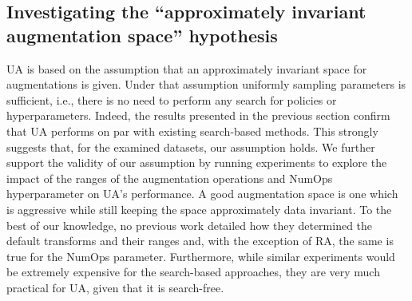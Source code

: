 \documentclass[runningheads]{llncs}
\newcommand{\attn}[1]{\textcolor{red}{(#1)}}
\begin{document}
	
	\begin{comment}
	\subsection{Discussion}
	\label{sec:discussions}
	
	A continuous parameter space covers a wider range of values and adds more variety to the data when compared to a discrete parameter space. Discretizing the search space reduces the chances of finding the optimal solution by limiting the search space into a limited number of options for parameters. Contrary to AA and RA, FAA searches for parameters over a continuous space. Although it has shown improvements over the baseline models and its search algorithm is proved to be effective, it suffers from a costly search phase. In fact, all of the aforementioned methods require search algorithms that are very expensive in terms of computational time and space comparing to our method. 
In this paper, we have reported the performance of random selection of augmentation functions over a continuous space and we argue, with theoretical evidence, that this setting is what should be used by researchers for fair comparison of augmentation pipelines with randomness, instead of a discrete space. 
	\attn{I think this paragraph, although technically correct, should be removed.  It breaks the flows as it seems to be drawing conclusiona from the experiments but then it's followwd by more experiments.  I'd remove 4.1 altogether.}
	
	\end{comment}
	
	\subsection{Investigating the ``approximately invariant augmentation space'' hypothesis}
	
	UA is based on the assumption that an approximately invariant space for augmentations is given.  Under that assumption uniformly sampling parameters is sufficient, i.e., there is no need to perform any search for policies or hyperparameters.  
	Indeed, the results presented in the previous section confirm that UA performs on par with existing search-based methods.  This strongly suggests that, for the examined datasets, our assumption holds. 
	We further support the validity of our assumption by running experiments to explore the impact of the ranges of the augmentation operations and NumOps hyperparameter on UA's performance.
A good augmentation space is one which is aggressive while still keeping the space approximately data invariant.
	To the best of our knowledge, no previous work detailed how they determined the default transforms and their ranges and, with the exception of RA, the same is true for the NumOps parameter.
	Furthermore, while similar experiments would be extremely expensive for the search-based approaches, they are very much practical for UA, given that it is search-free.
\end{document}
